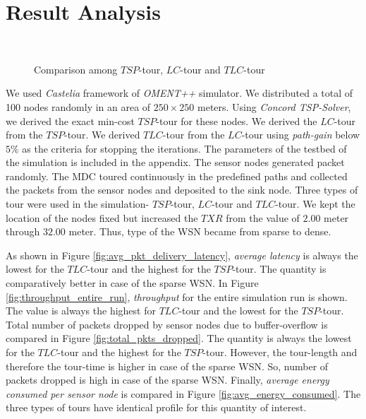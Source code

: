 \documentclass{llncs}
\begin{document}
\section{Result Analysis}
\begin{figure}[h!]
	\centering
		\\
	\caption{Comparison among $TSP$-tour, $LC$-tour and $TLC$-tour}
\end{figure} 
We used \textit{Castelia}\cite{castalia} framework of \textit{OMENT++} simulator. 
We distributed a total of 100 nodes randomly in an area of $250 \times 250$ meters. Using
\textit{Concord TSP-Solver}\cite{concordeTSPsolver}, we derived the exact min-cost $TSP$-tour for
these nodes. We derived the $LC$-tour from the $TSP$-tour. We derived $TLC$-tour from the $LC$-tour using 
\textit{path-gain} below $5\%$ as the criteria for stopping the iterations. The parameters of the
testbed of the simulation is included in the appendix. The sensor nodes generated packet randomly.
The MDC toured continuously in the predefined paths and collected the packets from the sensor nodes
and deposited to the sink node. Three types of tour were used in the simulation- $TSP$-tour,
$LC$-tour and $TLC$-tour. We kept the location of the nodes fixed but increased the $TXR$ from the
value of $2.00$ meter through $32.00$ meter. Thus, type of the WSN became from sparse to dense.

As shown in Figure \ref{fig:avg_pkt_delivery_latency}, \textit{average latency} is always the
lowest for the $TLC$-tour and the highest for the $TSP$-tour. The quantity is comparatively better
in case of the sparse WSN.
In Figure \ref{fig:throughput_entire_run}, \textit{throughput} for the entire simulation run is 
shown. The
value is always the highest for $TLC$-tour and the lowest for the $TSP$-tour. Total number of
packets dropped by sensor nodes due to buffer-overflow is compared in Figure
\ref{fig:total_pkts_dropped}. The quantity is always the
lowest for the $TLC$-tour and the highest for the $TSP$-tour. However, the tour-length and therefore
the tour-time is higher in case of the sparse WSN. So, number of packets dropped is high in case of
the sparse WSN. Finally, \textit{average energy consumed per sensor node} is compared in Figure
\ref{fig:avg_energy_consumed}. The three types of tours have identical profile for this quantity of
interest.
\end{document}
